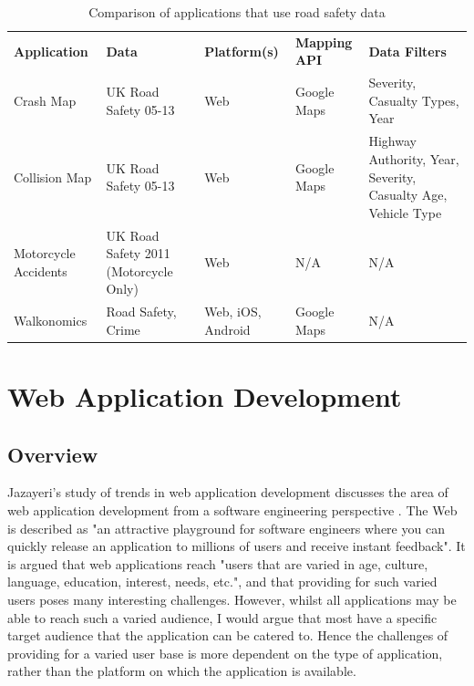 \documentclass[authoryearcitations]{UoYCSproject}
\begin{document}
\begin{table}[tbp]
   \caption{Comparison of applications that use road safety data}
  \begin{tabular}{ p{2.2cm}  p{3.0cm}  p{2.2cm}  p{2.0cm} p{3.0cm} }
      \textbf{Application} & \textbf{Data} & \textbf{Platform(s)} & \textbf{Mapping API} & \textbf{Data Filters}
    \\Crash Map & UK Road Safety 05-13 & Web & Google Maps & Severity, Casualty Types, Year
	\\Collision Map & UK Road Safety 05-13 & Web & Google Maps & Highway Authority, Year, Severity, Casualty Age, Vehicle Type
	\\Motorcycle Accidents & UK Road Safety 2011 (Motorcycle Only) & Web & N/A & N/A
	\\Walkonomics & Road Safety, Crime & Web, iOS, Android & Google Maps & N/A
  \end{tabular}
  \label{tab:applications}
\end{table}

\section{Web Application Development}

\subsection{Overview}

Jazayeri's study of trends in web application development discusses the area of web application development from a software engineering perspective \citep{Jazayeri2007}. The Web is described as "an attractive playground for software engineers where you can quickly release an application to millions of users and receive instant feedback". It is argued that web applications reach "users that are varied in age, culture, language, education, interest, needs, etc.", and that providing for such varied users poses many interesting challenges. However, whilst all applications may be able to reach such a varied audience, I would argue that most have a specific target audience that the application can be catered to. Hence the challenges of providing for a varied user base is more dependent on the type of application, rather than the platform on which the application is available. 
\end{document}
